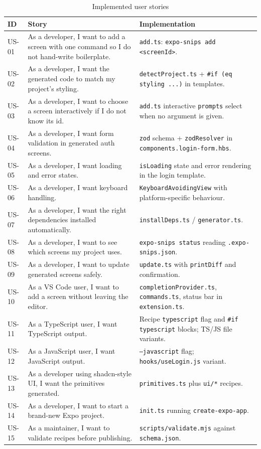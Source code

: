 \begin{longtable}{p{1.3cm}p{6.4cm}p{6.9cm}}
\caption{Implemented user stories}\\
\toprule
\textbf{ID} & \textbf{Story} & \textbf{Implementation} \\
\midrule

US-01 & As a developer, I want to add a screen with one command so I do not hand-write boilerplate. & \texttt{add.ts}: \texttt{expo-snips add <screenId>}. \\
US-02 & As a developer, I want the generated code to match my project's styling. & \texttt{detectProject.ts} + \texttt{\#if (eq styling ...)} in templates. \\
US-03 & As a developer, I want to choose a screen interactively if I do not know its id. & \texttt{add.ts} interactive \texttt{prompts} select when no argument is given. \\
US-04 & As a developer, I want form validation in generated auth screens. & \texttt{zod} schema + \texttt{zodResolver} in \texttt{components.login-form.hbs}. \\
US-05 & As a developer, I want loading and error states. & \texttt{isLoading} state and error rendering in the login template. \\
US-06 & As a developer, I want keyboard handling. & \texttt{KeyboardAvoidingView} with platform-specific behaviour. \\
US-07 & As a developer, I want the right dependencies installed automatically. & \texttt{installDeps.ts} / \texttt{generator.ts}. \\
US-08 & As a developer, I want to see which screens my project uses. & \texttt{expo-snips status} reading \texttt{.expo-snips.json}. \\
US-09 & As a developer, I want to update generated screens safely. & \texttt{update.ts} with \texttt{printDiff} and confirmation. \\
US-10 & As a VS Code user, I want to add a screen without leaving the editor. & \texttt{completionProvider.ts}, \texttt{commands.ts}, status bar in \texttt{extension.ts}. \\
US-11 & As a TypeScript user, I want TypeScript output. & Recipe \texttt{typescript} flag and \texttt{\#if typescript} blocks; TS/JS file variants. \\
US-12 & As a JavaScript user, I want JavaScript output. & \texttt{--javascript} flag; \texttt{hooks/useLogin.js} variant. \\
US-13 & As a developer using shadcn-style UI, I want the primitives generated. & \texttt{primitives.ts} plus \texttt{ui/*} recipes. \\
US-14 & As a developer, I want to start a brand-new Expo project. & \texttt{init.ts} running \texttt{create-expo-app}. \\
US-15 & As a maintainer, I want to validate recipes before publishing. & \texttt{scripts/validate.mjs} against \texttt{schema.json}. \\
\bottomrule
\end{longtable}

